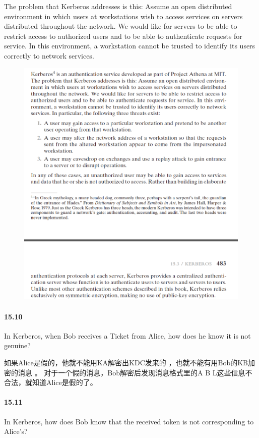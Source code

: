 \documentclass[UTF8]{article}
\begin{document}
The problem that Kerberos addresses is this: Assume an open distributed environment in which users at workstations wish to access services on servers distributed throughout the network. We would like for servers to be able to restrict access to authorized users and to be able to authenticate requests for service. In this environment, a workstation cannot be trusted to identify its users correctly to network services.
\begin{figure}[htbp]
	\centering
	\includegraphics[width=1\textwidth]{img/154.png}
\end{figure}
\paragraph{15.10}
In Kerberos, when Bob receives a Ticket from Alice, how does he know it is not genuine? 

如果Alice是假的，他就不能用KA解密出KDC发来的 ，也就不能有用Bob的KB加密的消息 。 对于一个假的消息，Bob解密后发现消息格式里的A B L这些信息不合法，就知道Alice是假的了。
\paragraph{15.11}
In Kerberos, how does Bob know that the received token is not corresponding to Alice’s?
\end{document}
